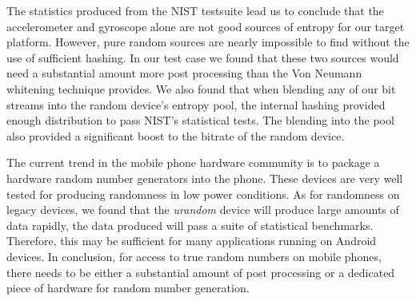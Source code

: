 
    The statistics produced from the NIST testsuite lead us to conclude that the accelerometer 
and gyroscope alone are not good sources of entropy for our target platform. However, pure random sources are nearly
impossible to find without the use of sufficient hashing. In our test case we found that these two 
 sources would need a substantial amount more post processing than the Von Neumann 
whitening technique provides. We also found that when blending any of our bit streams into 
the random device's entropy pool, the internal hashing provided enough distribution to pass NIST's statistical
tests. The blending into the pool also provided a significant boost to the bitrate of the random device.

    The current trend in the mobile phone hardware community is to package a hardware random
number generators into the phone. These devices are very well tested for producing randomness in low power
conditions. As for randomness on legacy devices, we found that the
\textit{urandom} device will produce large 
amounts of data rapidly, the data produced will pass a suite of statistical benchmarks. Therefore, this may be sufficient for
many applications running on Android devices. In conclusion, for access to true random numbers on mobile phones, there
needs to be either a substantial amount of post processing or a dedicated piece of hardware for random number generation.

